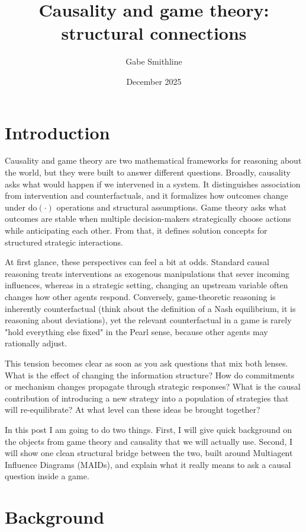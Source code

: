\documentclass{article}
\title{Causality and game theory: structural connections}
\author{Gabe Smithline}
\date{December 2025}
\providecommand{\do}{\mathrm{do}}
\begin{document}
\maketitle

\section{Introduction}
Causality and game theory are two mathematical frameworks for reasoning about the world, but they were built to answer different questions. Broadly, causality asks what would happen if we intervened in a system. It distinguishes association from intervention and counterfactuals, and it formalizes how outcomes change under \(\do(\cdot)\) operations and structural assumptions. Game theory asks what outcomes are stable when multiple decision-makers strategically choose actions while anticipating each other. From that, it defines solution concepts for structured strategic interactions.

At first glance, these perspectives can feel a bit at odds. Standard causal reasoning treats interventions as exogenous manipulations that sever incoming influences, whereas in a strategic setting, changing an upstream variable often changes how other agents respond. Conversely, game-theoretic reasoning is inherently counterfactual (think about the definition of a Nash equilibrium, it is reasoning about deviations), yet the relevant counterfactual in a game is rarely "hold everything else fixed" in the Pearl sense, because other agents may rationally adjust.

This tension becomes clear as soon as you ask questions that mix both lenses. What is the effect of changing the information structure? How do commitments or mechanism changes propagate through strategic responses? What is the causal contribution of introducing a new strategy into a population of strategies that will re-equilibrate? At what level can these ideas be brought together?

In this post I am going to do two things. First, I will give quick background on the objects from game theory and causality that we will actually use. Second, I will show one clean structural bridge between the two, built around Multiagent Influence Diagrams (MAIDs), and explain what it really means to ask a causal question inside a game.

\section{Background}
\end{document}
